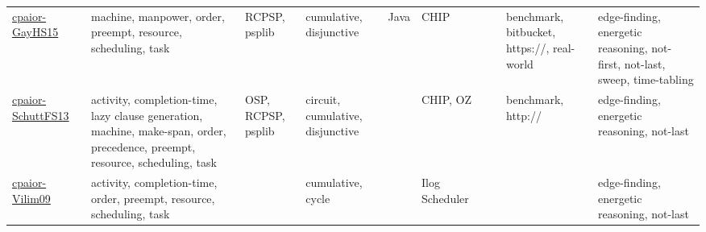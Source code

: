 {\begin{longtable}{p{3cm}p{4cm}p{2cm}p{2cm}p{2cm}p{2cm}p{2cm}p{2cm}p{2cm}p{2cm}}
\href{papers/cpaior-GayHS15.pdf}{cpaior-GayHS15}~\cite{cpaior-GayHS15} & machine, manpower, order, preempt, resource, scheduling, task & RCPSP, psplib & cumulative, disjunctive & Java & CHIP &  &  & benchmark, bitbucket, https://, real-world & edge-finding, energetic reasoning, not-first, not-last, sweep, time-tabling\\
\href{papers/cpaior-SchuttFS13.pdf}{cpaior-SchuttFS13}~\cite{cpaior-SchuttFS13} & activity, completion-time, lazy clause generation, machine, make-span, order, precedence, preempt, resource, scheduling, task & OSP, RCPSP, psplib & circuit, cumulative, disjunctive &  & CHIP, OZ &  &  & benchmark, http:// & edge-finding, energetic reasoning, not-last\\
\href{papers/cpaior-Vilim09.pdf}{cpaior-Vilim09}~\cite{cpaior-Vilim09} & activity, completion-time, order, preempt, resource, scheduling, task &  & cumulative, cycle &  & Ilog Scheduler &  &  &  & edge-finding, energetic reasoning, not-last\\
\end{longtable}
}

